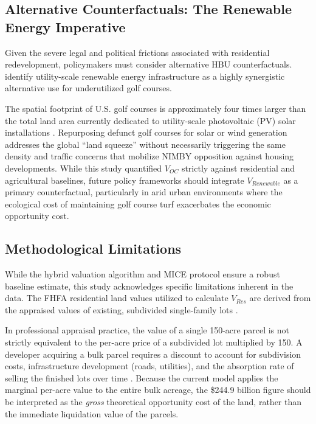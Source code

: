 \documentclass[10pt, letterpaper]{article}
\begin{document}
\subsection{Alternative Counterfactuals: The Renewable Energy Imperative}
Given the severe legal and political frictions associated with residential redevelopment, policymakers must consider alternative HBU counterfactuals. \textcite{Weinand2025} identify utility-scale renewable energy infrastructure as a highly synergistic alternative use for underutilized golf courses. 

The spatial footprint of U.S. golf courses is approximately four times larger than the total land area currently dedicated to utility-scale photovoltaic (PV) solar installations \parencite{Weinand2025}. Repurposing defunct golf courses for solar or wind generation addresses the global ``land squeeze'' without necessarily triggering the same density and traffic concerns that mobilize NIMBY opposition against housing developments. While this study quantified $V_{OC}$ strictly against residential and agricultural baselines, future policy frameworks should integrate $V_{Renewable}$ as a primary counterfactual, particularly in arid urban environments where the ecological cost of maintaining golf course turf exacerbates the economic opportunity cost.

\subsection{Methodological Limitations}
While the hybrid valuation algorithm and MICE protocol ensure a robust baseline estimate, this study acknowledges specific limitations inherent in the data. The FHFA residential land values utilized to calculate $V_{Res}$ are derived from the appraised values of existing, subdivided single-family lots \parencite{Davis2021}. 

In professional appraisal practice, the value of a single 150-acre parcel is not strictly equivalent to the per-acre price of a subdivided lot multiplied by 150. A developer acquiring a bulk parcel requires a discount to account for subdivision costs, infrastructure development (roads, utilities), and the absorption rate of selling the finished lots over time \parencite{AppraisalInstitute2020}. Because the current model applies the marginal per-acre value to the entire bulk acreage, the \$244.9 billion figure should be interpreted as the \textit{gross} theoretical opportunity cost of the land, rather than the immediate liquidation value of the parcels.
\end{document}
